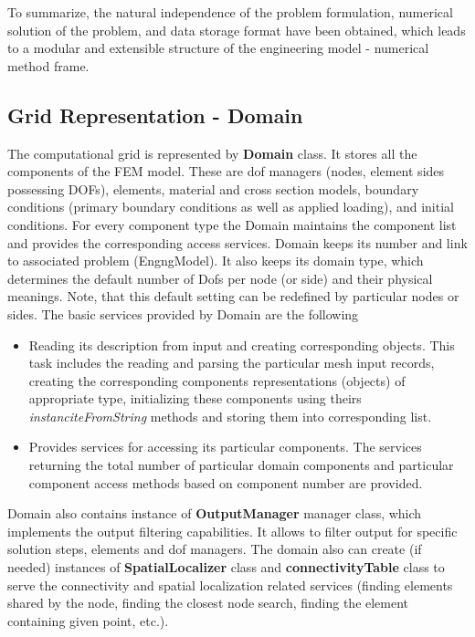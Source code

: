 \documentclass[a4paper]{article}
\newcommand{\class}[1]{{\bf #1}}
\newcommand{\service}[1]{{\em #1}}
\begin{document}
To summarize, the natural independence of the problem formulation,
numerical solution of the problem, and data storage format have been
obtained, which leads to a modular and extensible structure of the engineering
model - numerical method frame.

\subsection{Grid Representation - Domain}
The computational grid is represented by \class{Domain} class.
It stores all the components of the FEM model. These are dof managers
(nodes, element sides possessing DOFs), elements, material and cross
section models, boundary conditions
(primary boundary conditions as well as applied loading), and initial
conditions. For every component type the Domain maintains the
component list and provides the corresponding access services.
Domain keeps its number and link to associated problem (EngngModel).
It also keeps its domain type, which determines the default number of
Dofs per node (or side) and their physical meanings. Note, that this 
default setting can be redefined by particular nodes or sides.
The basic services provided by Domain are the following
\begin{itemize}
\item
Reading its description from input and creating corresponding objects.
This task includes the reading and parsing the particular mesh input
records, creating the corresponding components representations
(objects) of appropriate type, initializing these components using
theirs \service{instanciteFromString} methods and storing them into
corresponding list.
\item
Provides services for accessing its particular components. 
The services returning the total number of particular domain
components and particular component access methods based on component
number are provided. 
\end{itemize}
Domain also contains instance of \class{OutputManager} manager class,
which implements the output filtering capabilities. It allows to
filter output for specific solution steps, elements and dof managers.
The domain also can create (if needed) instances of
\class{SpatialLocalizer} class and \class{connectivityTable} class
to serve the connectivity and  spatial localization related services
(finding elements shared by the node, finding the closest node search,
finding the element containing given point, etc.).
\end{document}
